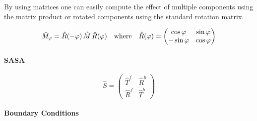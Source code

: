 \noindent
By using matrices one can easily compute the effect of multiple components using the matrix product or rotated components using the standard rotation matrix.

\begin{equation}
    \hat{M}_{\varphi} = \hat{R}(-\varphi) \, \hat{M} \, \hat{R}(\varphi)
    \qq{where}
    \hat{R}(\varphi) =
    \begin{pmatrix}
        \cos \varphi & \sin \varphi \\
        -\sin \varphi & \cos \varphi
    \end{pmatrix}
\end{equation}
\paragraph{SASA}

\begin{equation}
    \hat{S} =
    \begin{pmatrix}
        \hat{T}^f & \hat{R}^b \\
        \hat{R}^f & \hat{T}^b
    \end{pmatrix}
\end{equation}

\paragraph{Boundary Conditions}
